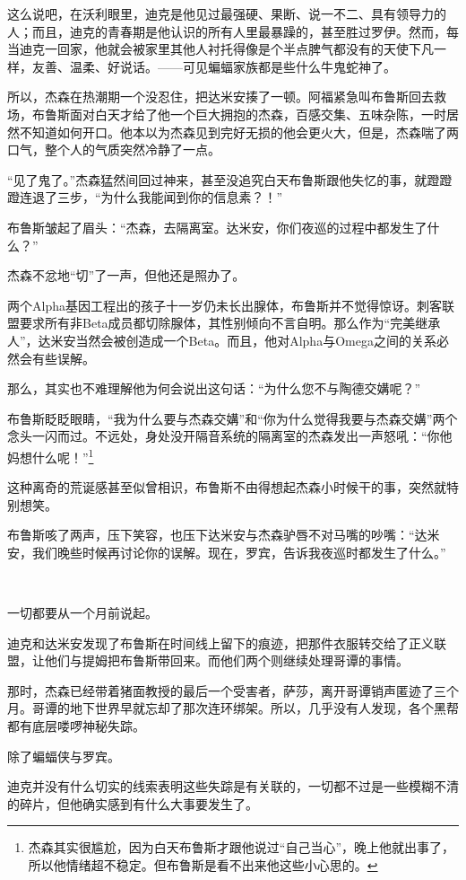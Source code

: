 \documentclass[../main]{subfiles}
\begin{document}
这么说吧，在沃利眼里，迪克是他见过最强硬、果断、说一不二、具有领导力的人；而且，迪克的青春期是他认识的所有人里最暴躁的，甚至胜过罗伊。然而，每当迪克一回家，他就会被家里其他人衬托得像是个半点脾气都没有的天使下凡一样，友善、温柔、好说话。——可见蝙蝠家族都是些什么牛鬼蛇神了。

所以，杰森在热潮期一个没忍住，把达米安揍了一顿。阿福紧急叫布鲁斯回去救场，布鲁斯面对白天才给了他一个巨大拥抱的杰森，百感交集、五味杂陈，一时居然不知道如何开口。他本以为杰森见到完好无损的他会更火大，但是，杰森喘了两口气，整个人的气质突然冷静了一点。

“见了鬼了。”杰森猛然间回过神来，甚至没追究白天布鲁斯跟他失忆的事，就蹬蹬蹬连退了三步，“为什么我能闻到你的信息素？！”

布鲁斯皱起了眉头：“杰森，去隔离室。达米安，你们夜巡的过程中都发生了什么？”

杰森不忿地“切”了一声，但他还是照办了。

两个Alpha基因工程出的孩子十一岁仍未长出腺体，布鲁斯并不觉得惊讶。刺客联盟要求所有非Beta成员都切除腺体，其性别倾向不言自明。那么作为“完美继承人”，达米安当然会被创造成一个Beta。而且，他对Alpha与Omega之间的关系必然会有些误解。

那么，其实也不难理解他为何会说出这句话：“为什么您不与陶德交媾呢？”

布鲁斯眨眨眼睛，“我为什么要与杰森交媾”和“你为什么觉得我要与杰森交媾”两个念头一闪而过。不远处，身处没开隔音系统的隔离室的杰森发出一声怒吼：“你他妈想什么呢！”\footnote[1]{杰森其实很尴尬，因为白天布鲁斯才跟他说过“自己当心”，晚上他就出事了，所以他情绪超不稳定。但布鲁斯是看不出来他这些小心思的。}

这种离奇的荒诞感甚至似曾相识，布鲁斯不由得想起杰森小时候干的事，突然就特别想笑。

布鲁斯咳了两声，压下笑容，也压下达米安与杰森驴唇不对马嘴的吵嘴：“达米安，我们晚些时候再讨论你的误解。现在，罗宾，告诉我夜巡时都发生了什么。”

~\

一切都要从一个月前说起。

迪克和达米安发现了布鲁斯在时间线上留下的痕迹，把那件衣服转交给了正义联盟，让他们与提姆把布鲁斯带回来。而他们两个则继续处理哥谭的事情。

那时，杰森已经带着猪面教授的最后一个受害者，萨莎，离开哥谭销声匿迹了三个月。哥谭的地下世界早就忘却了那次连环绑架。所以，几乎没有人发现，各个黑帮都有底层喽啰神秘失踪。

除了蝙蝠侠与罗宾。

迪克并没有什么切实的线索表明这些失踪是有关联的，一切都不过是一些模糊不清的碎片，但他确实感到有什么大事要发生了。
\end{document}
